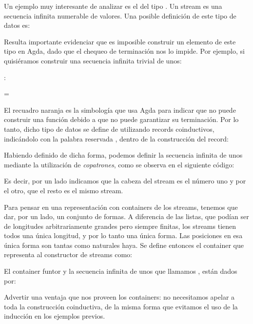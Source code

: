 
\begin{example} \label{example:stream}Un ejemplo muy interesante de analizar es el del tipo . Un stream es una secuencia infinita numerable de valores. Una posible definición de este tipo de datos es:


Resulta importante evidenciar que es imposible construir un elemento de este tipo en Agda, dado que el chequeo de terminación nos lo impide. Por ejemplo, si quisiéramos construir una secuencia infinita trivial de unos:

\sangrar
{} :  \AgdaDatatype{$\Nat$}

\hspace{2.5ex}
 =  \AgdaInductiveConstructor{$::$} 

El recuadro naranja es la simbología que usa Agda para indicar que no puede construir una función debido a que no puede garantizar su terminación. 
Por lo tanto, dicho tipo de datos se define de utilizando records coinductivos, indicándolo con la palabra reservada , dentro de la construcción del record:


Habiendo definido  de dicha forma, podemos definir la secuencia infinita de unos mediante la utilización de {\it copatrones}, como se observa en el siguiente código:


Es decir, por un lado indicamos que la cabeza del stream es el número uno y por el otro, que el resto es el mismo stream.

Para pensar en una representación con containers de los streams, tenemos que dar, por un lado, un conjunto de formas. A diferencia de las listas, que podían ser de longitudes arbitrariamente grandes pero siempre finitas, los streams tienen todos una única longitud, y por lo tanto una única forma. Las posiciones en esa única forma son tantas como naturales haya. Se define entonces el container que representa al constructor de streams como:


El container funtor  y la secuencia infinita de unos que llamamos , están dados por:


Advertir una ventaja que nos proveen los containers: no necesitamos apelar a toda la construcción coinductiva, de la misma forma que evitamos el uso de la inducción en los ejemplos previos. %

\end{example}

